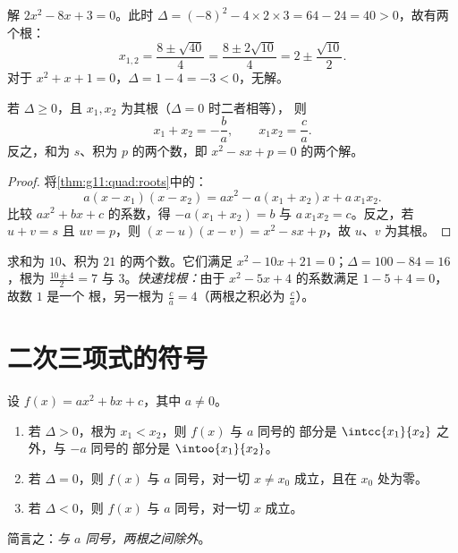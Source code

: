 \begin{example}\label{ex:g11:quad:solving}
解 $2x^2 - 8x + 3 = 0$。此时 $\Delta = (-8)^2 - 4 \times 2 \times 3 =
64 - 24 = 40 > 0$，故有两个根：
\[
x_{1,2} = \frac{8 \pm \sqrt{40}}{4} = \frac{8 \pm 2\sqrt{10}}{4}
= 2 \pm \frac{\sqrt{10}}{2}.
\]
对于 $x^2 + x + 1 = 0$，$\Delta = 1 - 4 = -3 < 0$，无解。
\end{example}

\begin{proposition}[根的和与积]\label{prop:g11:quad:vieta}
若 $\Delta \geq 0$，且 $x_1, x_2$ 为其根（$\Delta = 0$ 时二者相等），
则
\[
x_1 + x_2 = -\frac{b}{a},
\qquad
x_1 x_2 = \frac{c}{a} .
\]
反之，和为 $s$、积为 $p$ 的两个数，即
$x^2 - sx + p = 0$ 的两个解。
\end{proposition}

\begin{proof}
将\cref{thm:g11:quad:roots}中的：
\[
a(x - x_1)(x - x_2) = a x^2 - a(x_1 + x_2)x + a\,x_1 x_2 .
\]
比较 $ax^2 + bx + c$ 的系数，得
$-a(x_1+x_2) = b$ 与 $a\,x_1x_2 = c$。反之，若 $u + v = s$ 且
$uv = p$，则 $(x-u)(x-v) = x^2 - sx + p$，故 $u$、$v$ 为其根。
\end{proof}

\begin{example}
求和为 $10$、积为 $21$ 的两个数。它们满足
$x^2 - 10x + 21 = 0$；$\Delta = 100 - 84 = 16$，根为
$\frac{10 \pm 4}{2} = 7$ 与 $3$。\emph{快速找根：}由于
$x^2 - 5x + 4$ 的系数满足 $1 - 5 + 4 = 0$，故数 $1$ 是一个
根，另一根为 $\frac{c}{a} = 4$（两根之积必为
$\frac ca$）。
\end{example}

\section{二次三项式的符号}

\begin{theorem}[二次三项式的符号]\label{thm:g11:quad:sign}
设 $f(x) = ax^2+bx+c$，其中 $a \neq 0$。
\begin{enumerate}
  \item 若 $\Delta > 0$，根为 $x_1 < x_2$，则 $f(x)$ 与 $a$ 同号的
        部分是 $\intcc{x_1}{x_2}$ 之外，与 $-a$ 同号的
        部分是 $\intoo{x_1}{x_2}$。
  \item 若 $\Delta = 0$，则 $f(x)$ 与 $a$ 同号，对一切 $x \neq x_0$
        成立，且在 $x_0$ 处为零。
  \item 若 $\Delta < 0$，则 $f(x)$ 与 $a$ 同号，对一切 $x$ 成立。
\end{enumerate}
简言之：\emph{与 $a$ 同号，两根之间除外}。
\end{theorem}

